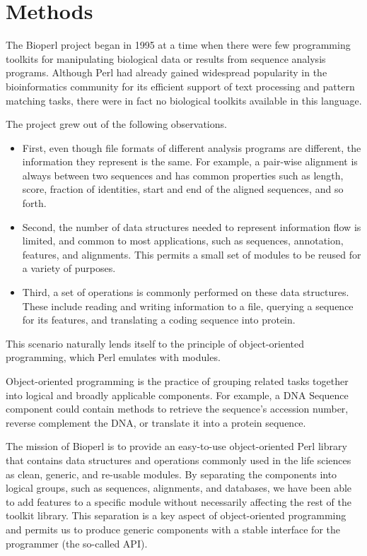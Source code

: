 \documentclass[12pt]{article}
\begin{document}
\section{Methods}

The Bioperl project began in 1995 \cite{chervitz-bits} at a time when
there were few programming toolkits for manipulating biological data
or results from sequence analysis programs.  Although Perl had already
gained widespread popularity in the bioinformatics community for its
efficient support of text processing and pattern matching tasks, there
were in fact no biological toolkits available in this language.

The project grew out of the following observations.  
\begin{itemize}

\item First, even though file formats of different analysis programs
are different, the information they represent is the same.  For
example, a pair-wise alignment is always between two sequences and has
common properties such as length, score, fraction of identities, start
and end of the aligned sequences, and so forth.

\item Second, the number of data structures needed to represent
information flow is limited, and common to most applications, such as
sequences, annotation, features, and alignments.  This permits a 
small set of modules to be reused for a variety of purposes.

\item Third, a set of operations is commonly performed on these data
structures.  These include reading and writing information to a file,
querying a sequence for its features, and translating a coding
sequence into protein.

\end{itemize}

This scenario naturally lends itself to the principle of
object-oriented programming, which Perl emulates with modules.

Object-oriented programming is the practice of grouping related tasks
together into logical and broadly applicable components.  For example,
a DNA Sequence component could contain methods to retrieve the
sequence's accession number, reverse complement the DNA, or translate
it into a protein sequence.

The mission of Bioperl is to provide an easy-to-use object-oriented
Perl library that contains data structures and operations commonly
used in the life sciences as clean, generic, and re-usable modules.
By separating the components into logical groups, such as sequences,
alignments, and databases, we have been able to add features to a
specific module without necessarily affecting the rest of the toolkit
library.  This separation is a key aspect of object-oriented
programming and permits us to produce generic components with a stable
interface for the programmer (the so-called API).  
\end{document}
